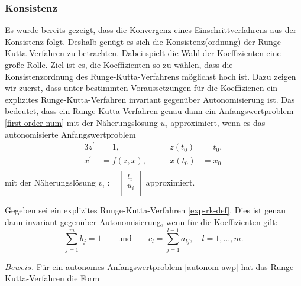 \subsubsection{Konsistenz}
Es wurde bereits gezeigt, dass die Konvergenz eines Einschrittverfahrens aus der Konsistenz folgt. Deshalb genügt es
sich die Konsistenz(ordnung) der Runge-Kutta-Verfahren zu betrachten. Dabei spielt die Wahl der Koeffizienten eine
große Rolle. Ziel ist es, die Koeffizienten so zu wählen, dass die Konsistenzordnung des Runge-Kutta-Verfahrens
möglichst hoch ist. Dazu zeigen wir zuerst, dass unter bestimmten Voraussetzungen für die Koeffizienen ein explizites
Runge-Kutta-Verfahren invariant gegenüber Autonomisierung ist. Das bedeutet, dass ein Runge-Kutta-Verfahren genau dann
ein Anfangswertproblem \eqref{first-order-num} mit der Näherungslösung $u_i$ approximiert, wenn es das autonomisierte
Anfangswertproblem
\begin{alignat}{3}
    \label{autonom-awp}
    z^{\prime} &= 1, \qquad &z(t_0) &= t_0, \\
    x^{\prime} &= f(z,x),\qquad  &x(t_0) &= x_0 \nonumber \\ \nonumber
\end{alignat}
mit der Näherungslösung $v_i := \left[ \begin{matrix}
                                           t_i\\
                                           u_i\\
\end{matrix} \right]$
approximiert.
\begin{satz}
    Gegeben sei ein explizites Runge-Kutta-Verfahren \eqref{exp-rk-def}. Dies ist genau dann invariant gegenüber
    Autonomisierung, wenn für die Koeffizienten gilt:
    \[
        \sum_{j=1}^{m} b_j = 1 \qquad \text{und} \qquad c_l=\sum_{j=1}^{l-1} a_{lj}, \quad l = 1, \dots, m.
    \]
\end{satz}
$Beweis.$ Für ein autonomes Anfangswertproblem \eqref{autonom-awp} hat das Runge-Kutta-Verfahren die Form
